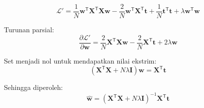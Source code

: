 \documentclass[a4paper,12pt]{article} %
\begin{document}
\begin{equation}
\mathcal{L}' = \frac{1}{N} \mathbf{w}^{\mathsf{T}} \mathbf{X}^{\mathsf{T}} \mathbf{X} \mathbf{w}
- \frac{2}{N} \mathbf{w}^{\mathsf{T}} \mathbf{X}^{\mathsf{T}} \mathbf{t}
+ \frac{1}{N} \mathbf{t}^{\mathsf{T}} \mathbf{t}
+ \lambda \mathbf{w}^{\mathsf{T}} \mathbf{w}
\end{equation}

Turunan parsial:
\begin{equation}
\frac{\partial \mathcal{L}'}{\partial \mathbf{w}} =
\frac{2}{N} \mathbf{X}^{\mathsf{T}} \mathbf{X} \mathbf{w}
- \frac{2}{N} \mathbf{X}^{\mathsf{T}} \mathbf{t} + 2\lambda\mathbf{w}
\end{equation}

Set menjadi nol untuk mendapatkan nilai ekstrim:
\begin{equation}
( \mathbf{X}^{\mathsf{T}} \mathbf{X} + N \lambda \mathbf{I} ) \mathbf{w} = \mathbf{X}^{\mathsf{T}} \mathbf{t}
\end{equation}

Sehingga diperoleh:
\begin{equation}
\hat{\mathbf{w}} =
( \mathbf{X}^{\mathsf{T}} \mathbf{X} + N \lambda \mathbf{I} )^{-1}
\mathbf{X}^{\mathsf{T}} \mathbf{t}
\end{equation}





\end{document}
